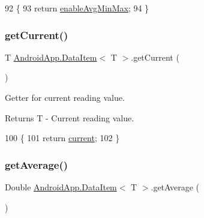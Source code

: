 \begin{DoxyCode}
92                                          \{
93         \textcolor{keywordflow}{return} \hyperlink{class_android_app_1_1_data_item_a330d3ade00b732f202d73dbb0d3b711f}{enableAvgMinMax};
94     \}
\end{DoxyCode}
\mbox{\label{class_android_app_1_1_data_item_aee0b56933fb8673f7b6e52cde9da157c}} 
\subsubsection{\texorpdfstring{get\+Current()}{getCurrent()}}
{\footnotesize\ttfamily T \hyperlink{class_android_app_1_1_data_item}{Android\+App.\+Data\+Item}$<$ T $>$.get\+Current (\begin{DoxyParamCaption}{ }\end{DoxyParamCaption})\hspace{0.3cm}{\ttfamily [inline]}}



Getter for current reading value. 

\begin{DoxyReturn}{Returns}
T -\/ Current reading value. 
\end{DoxyReturn}

\begin{DoxyCode}
100                           \{
101         \textcolor{keywordflow}{return} \hyperlink{class_android_app_1_1_data_item_aef9fad1dca931e60708187ab89769f54}{current};
102     \}
\end{DoxyCode}
\mbox{\label{class_android_app_1_1_data_item_ad3b598a42bc7e38aa46d5091a752a47b}} 
\subsubsection{\texorpdfstring{get\+Average()}{getAverage()}}
{\footnotesize\ttfamily Double \hyperlink{class_android_app_1_1_data_item}{Android\+App.\+Data\+Item}$<$ T $>$.get\+Average (\begin{DoxyParamCaption}{ }\end{DoxyParamCaption})\hspace{0.3cm}{\ttfamily [inline]}}



